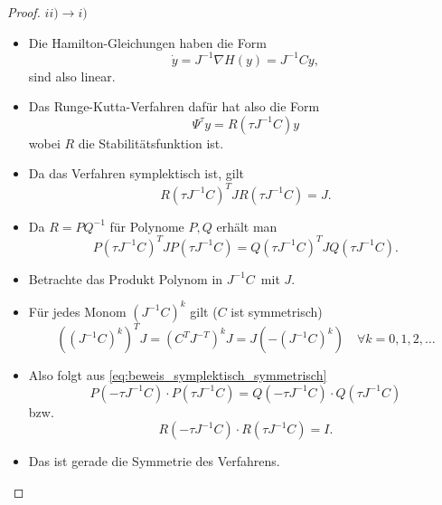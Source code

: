 \begin{proof}
	$ii) \to i)$\\
	\begin{itemize}
		\item Die Hamilton-Gleichungen haben die Form
		\begin{equation*}
			\dot y = J^{-1} \nabla H(y) = J^{-1}Cy,
		\end{equation*}
		sind also linear.

		\item Das Runge-Kutta-Verfahren dafür hat also die Form
		\begin{equation*}
			\Psi^\tau y = R(\tau J^{-1} C) y
		\end{equation*}
		wobei $R$ die Stabilitätsfunktion ist.
		\item Da das Verfahren symplektisch ist, gilt
		\begin{equation*}
			R(\tau J^{-1} C)^T J R(\tau J^{-1} C) = J.
		\end{equation*}

		\item Da $R= PQ^{-1}$ für Polynome $P,Q$ erhält man
		\begin{equation}\label{eq:beweis_symplektisch_symmetrisch}
			P(\tau J^{-1} C)^T JP(\tau J^{-1} C) = Q(\tau J^{-1} C)^T J Q(\tau J^{-1} C).
		\end{equation}


		\item Betrachte das Produkt \glqq Polynom in $J^{-1} C$\grqq\ mit $J$.

		\item Für jedes Monom $(J^{-1} C)^k$ gilt ($C$ ist symmetrisch)
		\begin{equation*}
			((J^{-1} C)^k)^T J
			=
			(C^T J^{-T})^k J
			=
			J(-(J^{-1} C)^k)\quad \forall k=0,1,2,\hdots
		\end{equation*}
		\item Also folgt aus \eqref{eq:beweis_symplektisch_symmetrisch}
		\begin{equation*}
			P(-\tau J^{-1} C)\cdot P(\tau J^{-1} C) =  Q(-\tau J^{-1} C)\cdot Q(\tau J^{-1} C)
		\end{equation*}
		bzw.
		\begin{equation*}
			R(-\tau J^{-1} C)\cdot R(\tau J^{-1} C) = I.
		\end{equation*}
		\item  Das ist gerade die Symmetrie des Verfahrens.
		\qedhere
	\end{itemize}
\end{proof}

